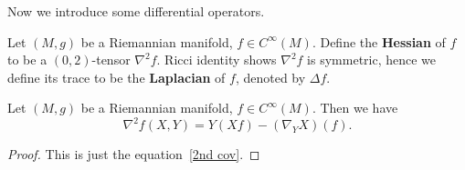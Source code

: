 Now we introduce some differential operators.

\begin{defn}
    Let $(M,g)$ be a Riemannian manifold, $f\in C^\infty(M)$.
    Define the \textbf{Hessian} of $f$ to be a $(0,2)$-tensor $\nabla^2f$.
    Ricci identity shows $\nabla^2f$ is symmetric, hence we define its trace to be the \textbf{Laplacian} of $f$, denoted by $\Delta f$.
\end{defn}

\begin{prop}
    Let $(M,g)$ be a Riemannian manifold, $f\in C^\infty(M)$.
    Then we have
    \[\nabla^2f(X,Y)=Y(Xf)-(\nabla_YX)(f).\]
\end{prop}
\begin{proof}
    This is just the equation~\ref{2nd cov}.
\end{proof}